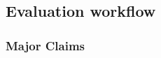 \documentclass[sigplan,twocolumn]{acmart}
\begin{document}
\subsection{Evaluation workflow}
{%

\subsubsection{Major Claims}

}
\end{document}
